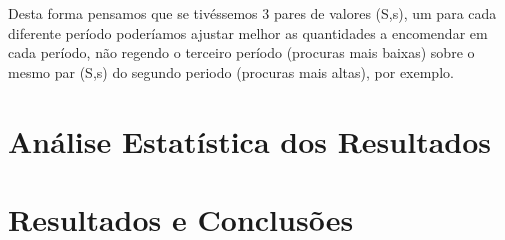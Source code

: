 \documentclass[a4paper]{article}
\begin{document}
Desta forma pensamos que se tivéssemos 3 pares de valores (S,s), um para cada diferente período poderíamos ajustar melhor as quantidades a encomendar em cada período, não regendo o terceiro período (procuras mais baixas) sobre o mesmo par (S,s) do segundo periodo (procuras mais altas), por exemplo.


\section{Análise Estatística dos Resultados}

\section{Resultados e Conclusões}
\label{sec:conclusao}
\end{document}
